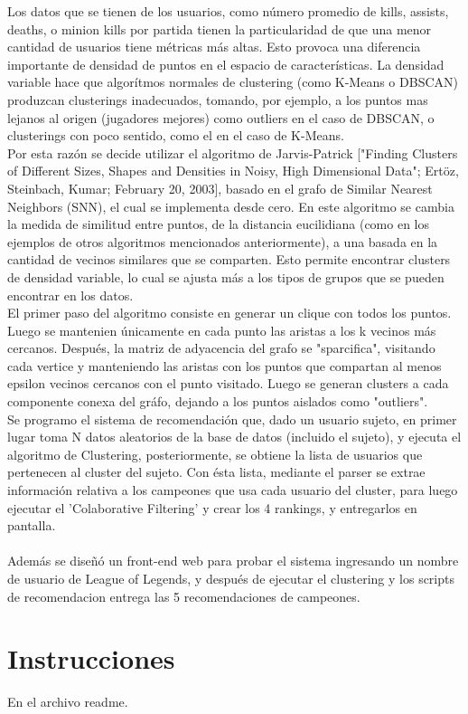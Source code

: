\documentclass[letterpaper,11pt, spanish]{article}
\begin{document}
Los datos que se tienen de los usuarios, como número promedio de kills, assists, deaths, o minion kills por partida tienen la particularidad de que una menor cantidad de usuarios tiene métricas más altas. Esto provoca una diferencia importante de densidad de puntos en el espacio de características. La densidad variable hace que algorítmos normales de clustering (como K-Means o DBSCAN) produzcan clusterings inadecuados, tomando, por ejemplo, a los puntos mas lejanos al origen (jugadores mejores) como outliers en el caso de DBSCAN, o clusterings con poco sentido, como el en el caso de K-Means. \\

Por esta razón se decide utilizar el algoritmo de Jarvis-Patrick ["Finding Clusters of Different Sizes, Shapes and Densities in Noisy, High Dimensional Data"; Ertöz, Steinbach, Kumar; February 20, 2003], basado en el grafo de Similar Nearest Neighbors (SNN), el cual se implementa desde cero. En este algoritmo se cambia la medida de similitud entre puntos, de la distancia eucilidiana (como en los ejemplos de otros algoritmos mencionados anteriormente), a una basada en la cantidad de vecinos similares que se comparten. Esto permite encontrar clusters de densidad variable, lo cual se ajusta más a los tipos de grupos que se pueden encontrar en los datos. \\

El primer paso del algoritmo consiste en generar un clique con todos los puntos. Luego se mantenien únicamente en cada punto las aristas a los k vecinos más cercanos. Después, la matriz de adyacencia del grafo se "sparcifica", visitando cada vertice y manteniendo las aristas con los puntos que compartan al menos epsilon vecinos cercanos con el punto visitado. Luego se generan clusters a cada componente conexa del gráfo, dejando a los puntos aislados como "outliers". \\

Se programo el sistema de recomendación que, dado un usuario sujeto, en primer lugar toma N datos aleatorios de la base de datos (incluido el sujeto), y ejecuta el algoritmo de Clustering, posteriormente, se obtiene la lista de usuarios que pertenecen al cluster del sujeto. Con ésta lista, mediante el parser se extrae información relativa a los campeones que usa cada usuario del cluster, para luego ejecutar el 'Colaborative Filtering' y crear los 4 rankings, y entregarlos en pantalla.\\
\\
Además se diseñó un front-end web para probar el sistema ingresando un nombre de usuario de League of Legends, y después de ejecutar el clustering y los scripts de recomendacion entrega las 5 recomendaciones de campeones.

\section{Instrucciones}

En el archivo readme.

\end{document}
